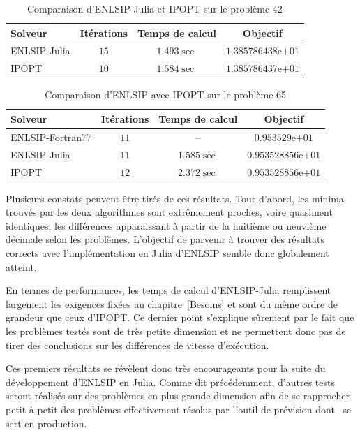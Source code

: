 \begin{table}
    \centering
    \begin{tabular}{|l|c|c|c|}
        \hline
        Solveur & Itérations & Temps de calcul &  Objectif \\ \hline
        ENLSIP-Julia & $15$ & $1.493\sec$ & $1.385786438\text{e+}01$ \\\hline
        IPOPT & $10$ & $1.584\sec$ & $1.385786437\text{e+}01$\\ \hline
    \end{tabular}  
    \caption{Comparaison d'ENLSIP-Julia et IPOPT sur le problème 42}
    \label{resultats:pb42}
\end{table}

\begin{table}
    \centering
    \begin{tabular}{|l|c|c|c|}
        \hline
        Solveur & Itérations & Temps de calcul &  Objectif \\ \hline
        ENLSIP-Fortran77 & $11$ & -- & $0.953529\text{e+}01$ \\\hline
        ENLSIP-Julia & $11$ & $1.585\sec$ & $0.953528856\text{e+}01$\\\hline
        IPOPT & $12$ & $2.372\sec$ & $0.953528856\text{e+}01$\\ \hline
    \end{tabular}  
    \caption{Comparaison d'ENLSIP avec IPOPT sur le problème 65}
    \label{resultats:pb65}
\end{table}


Plusieurs constats peuvent être tirés de ces résultats. Tout d'abord, les minima trouvés par les deux algorithmes sont extrêmement proches, voire quasiment identiques, 
les différences apparaissant à partir de la huitième ou neuvième décimale selon les problèmes. L'objectif de parvenir à trouver des résultats corrects avec l'implémentation en Julia
d'ENLSIP semble donc globalement atteint.

En termes de performances, les temps de calcul d'ENLSIP-Julia remplissent largement les exigences fixées au chapitre~\ref{Besoins} et sont du même ordre de grandeur
que ceux d'IPOPT. Ce dernier point s'explique sûrement par le fait que les problèmes testés sont de très petite dimension et ne permettent donc pas de tirer des conclusions sur les différences 
de vitesse d'exécution. 

Ces premiers résultats se révèlent donc très encourageants pour la suite du développement d'ENLSIP en Julia.
Comme dit précédemment, d'autres tests seront réalisés sur des problèmes en plus grande dimension afin de se rapprocher petit à petit des problèmes effectivement résolus par l'outil 
de prévision dont \HQ\ se sert en production.